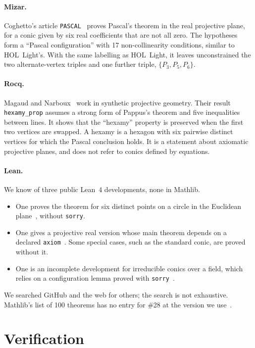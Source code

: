 \documentclass[11pt]{article}
\theoremstyle{remark}
\newcommand{\lean}[1]{\texttt{#1}}
\begin{document}
\paragraph{Mizar.} Coghetto's article \texttt{PASCAL}~\cite{Coghetto} proves Pascal's theorem in
the real projective plane, for a conic given by six real coefficients that are not all zero. The
hypotheses form a ``Pascal configuration'' with 17 non-collinearity conditions, similar to
HOL~Light's. With the same labelling as HOL~Light, it leaves unconstrained the two alternate-vertex triples and one further triple, $\{P_3,P_5,P_6\}$.

\paragraph{Rocq.} Magaud and Narboux~\cite{MagaudNarboux} work in synthetic projective geometry. Their
result \texttt{hexamy\_prop} assumes a strong form of Pappus's theorem and five inequalities
between lines. It shows that the ``hexamy'' property is preserved when the first two vertices are
swapped. A hexamy is a hexagon with six pairwise distinct vertices for which the Pascal conclusion
holds. It is a statement about
axiomatic projective planes, and does not refer to conics defined by equations.

\paragraph{Lean.} We know of three public Lean~4 developments, none in Mathlib.
\begin{itemize}
\item One proves the theorem for six distinct points on a circle in the Euclidean
plane~\cite{PlbyLean}, without \lean{sorry}.
\item One gives a projective real version whose main theorem depends on a declared
\lean{axiom}~\cite{LeanGenius}. Some special cases, such as the standard conic, are proved without it.
\item One is an incomplete development for irreducible conics over a field, which relies on a
configuration lemma proved with \lean{sorry}~\cite{AtlasLean}.
\end{itemize}
We searched GitHub and the web for others; the search is not exhaustive. Mathlib's list of 100
theorems has no entry for \#28 at the version we use~\cite{Mathlib100}.

\section{Verification}\label{sec:gate}
\end{document}
